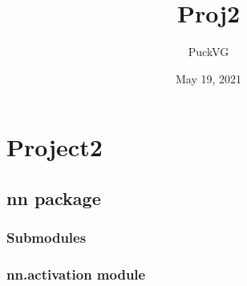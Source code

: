 \documentclass[letterpaper,10pt,english]{sphinxmanual}
\title{Proj2}
\date{May 19, 2021}
\author{PuckVG}
\begin{document}
\pagestyle{empty}
\sphinxmaketitle
\pagestyle{plain}
\sphinxtableofcontents
\pagestyle{normal}
\label{\detokenize{index::doc}}



\chapter{Project2}
\label{\detokenize{modules:project2}}\label{\detokenize{modules::doc}}

\section{nn package}
\label{\detokenize{nn:nn-package}}\label{\detokenize{nn::doc}}

\subsection{Submodules}
\label{\detokenize{nn:submodules}}

\subsection{nn.activation module}
\label{\detokenize{nn:module-nn.activation}}\label{\detokenize{nn:nn-activation-module}}
\end{document}
